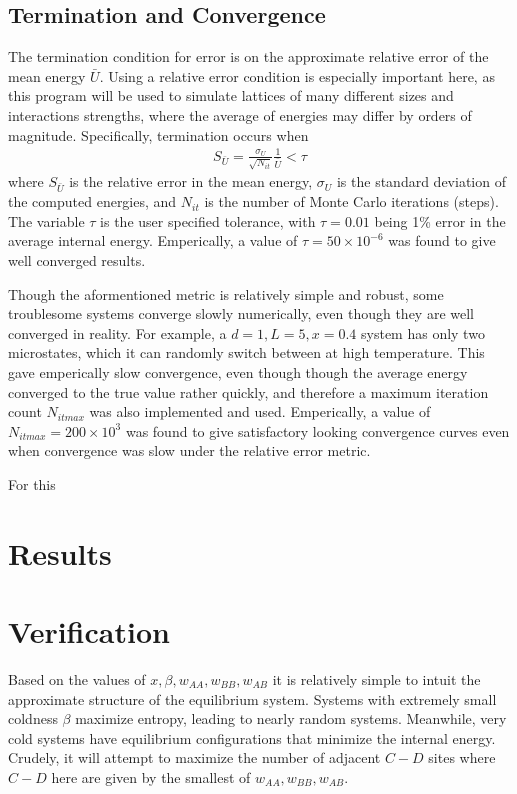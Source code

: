 \documentclass[10pt]{article}
\begin{document}
\subsection{Termination and Convergence}
The termination condition for error is on the approximate relative error of the mean energy $\bar{U}$.
Using a relative error condition is especially important here, as this program will be used to simulate lattices of many different sizes and interactions strengths, where the average of energies may differ by orders of magnitude.
Specifically, termination occurs when
\begin{align}
    S_{\bar{U}} =
    \frac{\sigma_{U}}{\sqrt{N_{it}}} \frac{1}{\bar{U}}
    < \tau
\end{align}
where $S_{\bar{U}}$ is the relative error in the mean energy, $\sigma_{U}$ is the standard deviation of the computed energies, and $N_{it}$ is the number of Monte Carlo iterations (steps).
The variable $\tau$ is the user specified tolerance, with $\tau = 0.01$ being 1\% error in the average internal energy.
Emperically, a value of $\tau = 50 \times 10^{-6}$ was found to give well converged results.

Though the aformentioned metric is relatively simple and robust, some troublesome systems converge slowly numerically, even though they are well converged in reality.
For example, a $d=1, L=5, x=0.4$ system has only two microstates, which it can randomly switch between at high temperature.
This gave emperically slow convergence, even though though the average energy converged to the true value rather quickly, and therefore a maximum iteration count $N_{it max}$ was also implemented and used.
Emperically, a value of $N_{it max} = 200 \times 10^3$ was found to give satisfactory looking convergence curves even when convergence was slow under the relative error metric.

For this 

\section{Results}

\section{Verification}
Based on the values of $x,\beta,w_{AA},w_{BB},w_{AB}$ it is relatively simple to intuit the approximate structure of the equilibrium system.
Systems with extremely small coldness $\beta$ maximize entropy, leading to nearly random systems.
Meanwhile, very cold systems have equilibrium configurations that minimize the internal energy.
Crudely, it will attempt to maximize the number of adjacent $C-D$ sites where $C-D$ here are given by the smallest of $w_{AA},w_{BB},w_{AB}$.
\end{document}
